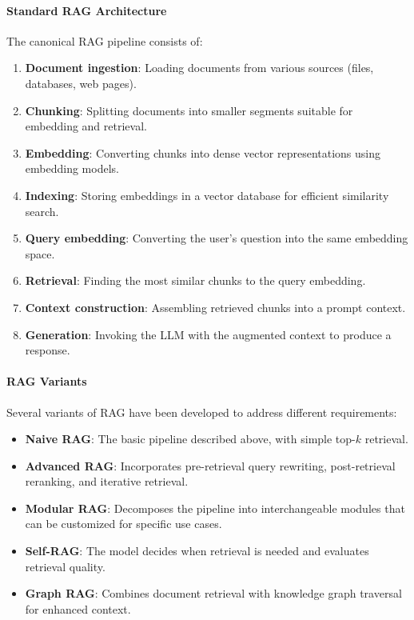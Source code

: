 \paragraph{Standard RAG Architecture}

The canonical RAG pipeline consists of:

\begin{enumerate}
    \item \textbf{Document ingestion}: Loading documents from various sources (files, databases, web pages).
    
    \item \textbf{Chunking}: Splitting documents into smaller segments suitable for embedding and retrieval.
    
    \item \textbf{Embedding}: Converting chunks into dense vector representations using embedding models.
    
    \item \textbf{Indexing}: Storing embeddings in a vector database for efficient similarity search.
    
    \item \textbf{Query embedding}: Converting the user's question into the same embedding space.
    
    \item \textbf{Retrieval}: Finding the most similar chunks to the query embedding.
    
    \item \textbf{Context construction}: Assembling retrieved chunks into a prompt context.
    
    \item \textbf{Generation}: Invoking the LLM with the augmented context to produce a response.
\end{enumerate}

\paragraph{RAG Variants}

Several variants of RAG have been developed to address different requirements:

\begin{itemize}
    \item \textbf{Naive RAG}: The basic pipeline described above, with simple top-$k$ retrieval.
    
    \item \textbf{Advanced RAG}: Incorporates pre-retrieval query rewriting, post-retrieval reranking, and iterative retrieval.
    
    \item \textbf{Modular RAG}: Decomposes the pipeline into interchangeable modules that can be customized for specific use cases.
    
    \item \textbf{Self-RAG}: The model decides when retrieval is needed and evaluates retrieval quality.
    
    \item \textbf{Graph RAG}: Combines document retrieval with knowledge graph traversal for enhanced context.
\end{itemize}

